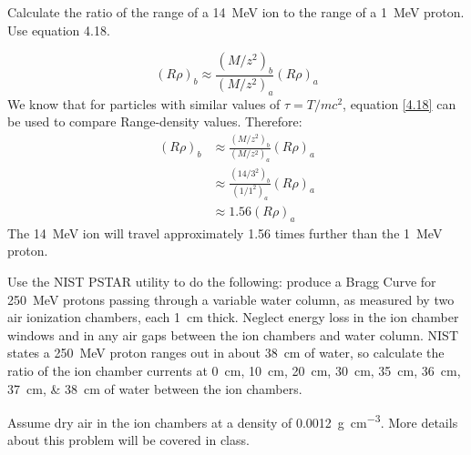 \documentclass{hw}
\begin{document}
Calculate the ratio of the range of a \SI{14}{\mega\electronvolt}  ion to the range of a \SI{1}{\mega\electronvolt} proton. Use equation 4.18.

\begin{equation}
	\left( R \rho \right)_b \approx \frac{\left( M/z^2 \right)_b}{\left( M / z^2 \right)_a} \left( R \rho \right)_a \tag{4.18}
	\label{4.18}
\end{equation}
\solution
We know that for particles with similar values of $ \tau = T / m c^2 $, equation \ref{4.18} can be used to compare Range-density values. Therefore:
\begin{align*}
	\left( R \rho \right)_b &\approx \frac{\left( M/z^2 \right)_b}{\left( M / z^2 \right)_a} \left( R \rho \right)_a \\
	&\approx \frac{\left( 14/3^2 \right)_b}{\left( 1 / 1^2 \right)_a} \left( R \rho \right)_a \\
	&\approx 1.56 \left( R \rho \right)_a
\end{align*}
The \SI{14}{\mega\electronvolt}  ion will travel approximately \num{1.56} times further than the \SI{1}{\mega\electronvolt} proton.

\problem{}
Use the NIST PSTAR utility to do the following: produce a Bragg Curve for \SI{250}{\mega\electronvolt} protons passing through a variable water column, as measured by two air ionization chambers, each \SI{1}{\centi\meter} thick. Neglect energy loss in the ion chamber windows and in any air gaps between the ion chambers and water column. NIST states a \SI{250}{\mega\electronvolt} proton ranges out in about \SI{38}{\centi\meter} of water, so calculate the ratio of the ion chamber currents at \SIlist{0;10;20;30;35;36;37;38}{\centi\meter} of water between the ion chambers.

Assume dry air in the ion chambers at a density of \SI{0.0012}{\gram\per\centi\meter^3}. More details about this problem will be covered in class.
\solution
\end{document}
